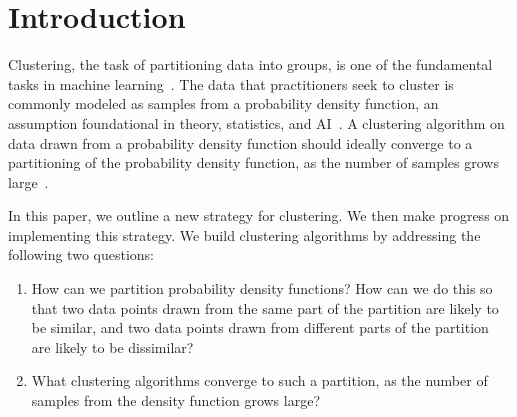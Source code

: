 \section{Introduction}

Clustering, the task of
partitioning data into groups, is one of the fundamental tasks
in machine learning~\cite{bishopBook, NgSpectral01, e96, kk10clustering, sw18}.
The data that practitioners seek to cluster is commonly modeled as samples from a probability density function,
an assumption foundational in theory, statistics, and AI~\cite{bishopBook,
TrillosContin16, bc17focs, mv10, Ge2018}. 
A clustering algorithm on data drawn from a probability density function
should ideally converge to a partitioning of the
probability density function, as the number of samples grows
large~\cite{von2008consistency, TrillosVariational15,
TrillosContin16}.
 

In this paper, we outline a new strategy for
clustering. We then make progress on implementing this strategy. We
build clustering algorithms by addressing the following two questions:

\begin{enumerate}
  \item How can we partition probability density functions? How can we
    do this so
    that two data points drawn from the same part of the partition are
    likely to be similar, and two data points drawn from different parts of the partition
    are likely to be dissimilar?

  \item What clustering algorithms converge to such a partition, 
    as the number of samples from the density function grows large?
\end{enumerate}

